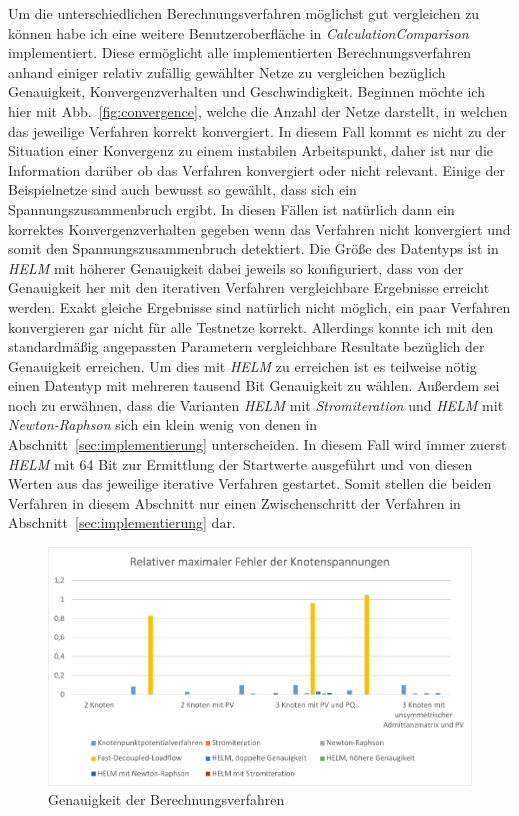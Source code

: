 \documentclass[12pt,a4paper]{article}
\newcommand{\reffig}[1]{{Abb.~\ref{fig:#1}}}
\newcommand{\refsec}[1]{{Abschnitt~\ref{sec:#1}}}
\begin{document}
	Um die unterschiedlichen Berechnungsverfahren möglichst gut vergleichen zu können habe ich eine weitere Benutzeroberfläche in \emph{CalculationComparison} implementiert. Diese ermöglicht alle implementierten Berechnungsverfahren anhand einiger relativ zufällig gewählter Netze zu vergleichen bezüglich Genauigkeit, Konvergenzverhalten und Geschwindigkeit. Beginnen möchte ich hier mit \reffig{convergence}, welche die Anzahl der Netze darstellt, in welchen das jeweilige Verfahren korrekt konvergiert. In diesem Fall kommt es nicht zu der Situation einer Konvergenz zu einem instabilen Arbeitspunkt, daher ist nur die Information darüber ob das Verfahren konvergiert oder nicht relevant. Einige der Beispielnetze sind auch bewusst so gewählt, dass sich ein Spannungszusammenbruch ergibt. In diesen Fällen ist natürlich dann ein korrektes Konvergenzverhalten gegeben wenn das Verfahren nicht konvergiert und somit den Spannungszusammenbruch detektiert. Die Größe des Datentyps ist in \emph{HELM} mit höherer Genauigkeit dabei jeweils so konfiguriert, dass von der Genauigkeit her mit den iterativen Verfahren vergleichbare Ergebnisse erreicht werden. Exakt gleiche Ergebnisse sind natürlich nicht möglich, ein paar Verfahren konvergieren gar nicht für alle Testnetze korrekt. Allerdings konnte ich mit den standardmäßig angepassten Parametern vergleichbare Resultate bezüglich der Genauigkeit erreichen. Um dies mit \emph{HELM} zu erreichen ist es teilweise nötig einen Datentyp mit mehreren tausend Bit Genauigkeit zu wählen. Außerdem sei noch zu erwähnen, dass die Varianten \emph{HELM} mit \emph{Stromiteration} und \emph{HELM} mit \emph{Newton-Raphson} sich ein klein wenig von denen in \refsec{implementierung} unterscheiden. In diesem Fall wird immer zuerst \emph{HELM} mit 64 Bit zur Ermittlung der Startwerte ausgeführt und von diesen Werten aus das jeweilige iterative Verfahren gestartet. Somit stellen die beiden Verfahren in diesem Abschnitt nur einen Zwischenschritt der Verfahren in \refsec{implementierung} dar.
	
	\begin{figure}
		\centering
		\includegraphics[scale=0.8]{pictures/precision_1}
		\caption{Genauigkeit der Berechnungsverfahren}
		\label{fig:precision_1}
	\end{figure}
	
\end{document}
